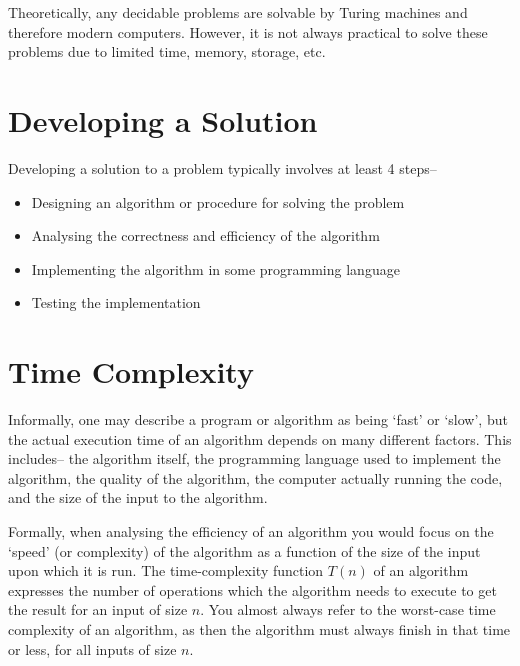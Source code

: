 
Theoretically, any decidable problems are solvable by Turing machines and therefore modern computers. However, it is not
 always practical to solve these problems due to limited time, memory, storage, etc.

\section*{Developing a Solution}

Developing a solution to a problem typically involves at least 4 steps--
\begin{itemize}
  \item Designing an algorithm or procedure for solving the problem
  \item Analysing the correctness and efficiency of the algorithm
  \item Implementing the algorithm in some programming language
  \item Testing the implementation
\end{itemize}

\section*{Time Complexity}

Informally, one may describe a program or algorithm as being `fast' or `slow', but the actual execution time of an
 algorithm depends on many different factors. This includes-- the algorithm itself, the programming language used to
 implement the algorithm, the quality of the algorithm, the computer actually running the code, and the size of the
 input to the algorithm.

Formally, when analysing the efficiency of an algorithm you would focus on the `speed' (or complexity) of the algorithm
 as a function of the size of the input upon which it is run. The time-complexity function $T(n)$ of an algorithm
 expresses the number of operations which the algorithm needs to execute to get the result for an input of size $n$.
 You almost always refer to the worst-case time complexity of an algorithm, as then the algorithm must always finish
 in that time or less, for all inputs of size $n$.

